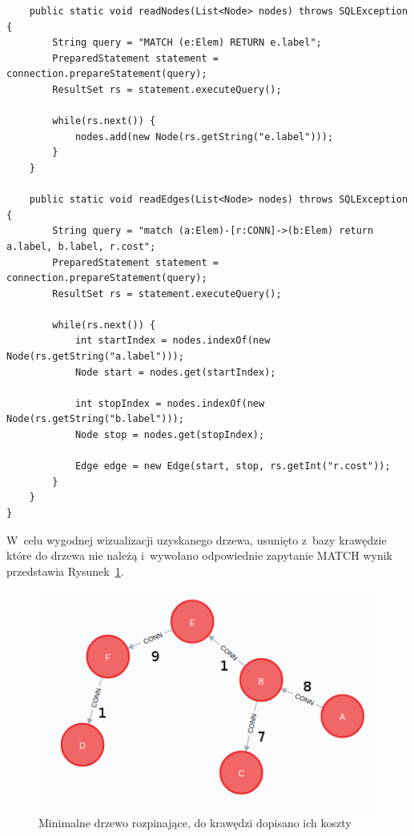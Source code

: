 \documentclass[a4paper,9pt]{extarticle}	%
\begin{document}
\begin{enumerate}
\begin{lstlisting}
    public static void readNodes(List<Node> nodes) throws SQLException {
        String query = "MATCH (e:Elem) RETURN e.label";
        PreparedStatement statement = connection.prepareStatement(query);
        ResultSet rs = statement.executeQuery();

        while(rs.next()) {
            nodes.add(new Node(rs.getString("e.label")));
        }
    }

    public static void readEdges(List<Node> nodes) throws SQLException {
        String query = "match (a:Elem)-[r:CONN]->(b:Elem) return a.label, b.label, r.cost";
        PreparedStatement statement = connection.prepareStatement(query);
        ResultSet rs = statement.executeQuery();

        while(rs.next()) {
            int startIndex = nodes.indexOf(new Node(rs.getString("a.label")));
            Node start = nodes.get(startIndex);

            int stopIndex = nodes.indexOf(new Node(rs.getString("b.label")));
            Node stop = nodes.get(stopIndex);

            Edge edge = new Edge(start, stop, rs.getInt("r.cost"));
        }
    }
}
\end{lstlisting}

W~celu wygodnej wizualizacji uzyskanego drzewa, usunięto z~bazy krawędzie które do drzewa nie należą i~wywołano odpowiednie zapytanie MATCH \ppauza wynik przedstawia Rysunek~\ref{scrn:10b}.

\begin{figure}[ht]
  \centering
  \includegraphics[scale=0.5]{screeny/10b.png}
  \caption{Minimalne drzewo rozpinające, do krawędzi dopisano ich koszty}
  \label{scrn:10b}
\end{figure}

\end{enumerate}
\end{document}
